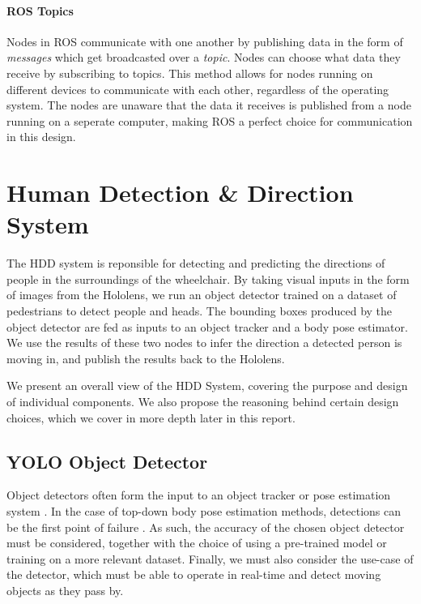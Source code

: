 \paragraph{ROS Topics} Nodes in ROS communicate with one another by publishing data in the form of \textit{messages} which get broadcasted over a \textit{topic}. Nodes can choose what data they receive by subscribing to topics. This method allows for nodes running on different devices to communicate with each other, regardless of the operating system. The nodes are unaware that the data it receives is published from a node running on a seperate computer, making ROS a perfect choice for communication in this design.

\section{Human Detection \& Direction System}
The HDD system is reponsible for detecting and predicting the directions of people in the surroundings of the wheelchair. By taking visual inputs in the form of images from the Hololens, we run an object detector trained on a dataset of pedestrians to detect people and heads. The bounding boxes produced by the object detector are fed as inputs to an object tracker and a body pose estimator. We use the results of these two nodes to infer the direction a detected person is moving in, and publish the results back to the Hololens.


We present an overall view of the HDD System, covering the purpose and design of individual components. We also propose the reasoning behind certain design choices, which we cover in more depth later in this report.

\subsection{YOLO Object Detector} \label{sec:yolo}
Object detectors often form the input to an object tracker or pose estimation system \cite{Bewley2016, Jin2017}. In the case of top-down body pose estimation methods, detections can be the first point of failure \cite{Insafutdinov}. As such, the accuracy of the chosen object detector must be considered, together with the choice of using a pre-trained model or training on a more relevant dataset. Finally, we must also consider the use-case of the detector, which must be able to operate in real-time and detect moving objects as they pass by.

